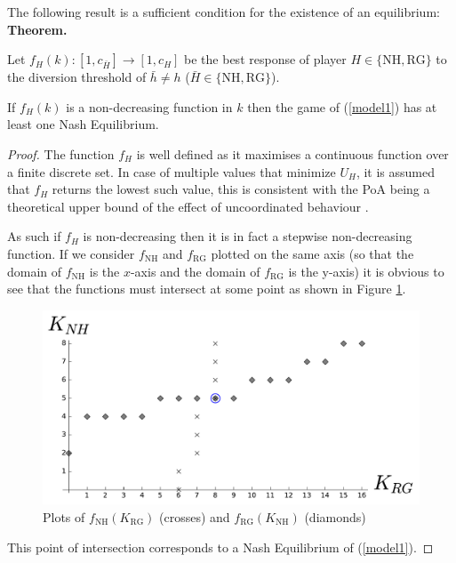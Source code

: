 \documentclass{article}
\newcommand{\NH}{\text{NH}}
\newcommand{\RG}{\text{RG}}
\begin{document}
The following result is a sufficient condition for the existence of an equilibrium:\\


\textbf{Theorem.}

Let $f_{H}(k):[1,c_{\bar H}]\to[1,c_H]$ be the best response of player $H\in\{\NH, \RG\}$ to the diversion threshold of $\bar h\ne h$ ($\bar H\in\{\NH, \RG\}$).

If $f_{H}(k)$ is a non-decreasing function in $k$ then the game of
(\ref{model1}) has at least one Nash Equilibrium.


\begin{proof}

The function $f_H$ is well defined as it maximises a continuous function over a finite discrete set.
In case of multiple values that minimize $U_H$, it is assumed that $f_H$ returns the lowest such value, this is consistent with the PoA being a theoretical upper bound of the effect of uncoordinated behaviour \cite{TimRoughgarden}.

As such if $f_H$ is non-decreasing then it is in fact a stepwise non-decreasing function.
If we consider $f_{\NH}$ and $f_{\RG}$ plotted on the same axis (so that the domain of $f_{\NH}$ is the $x$-axis and the domain of $f_{\RG}$ is the y-axis) it is obvious to see that the functions must intersect at some point as shown in Figure \ref{exampleforproof}.

\begin{figure}[!htbp]
    \begin{center}
        \includegraphics[width=.7\textwidth]{./Images/best_responses_ex_for_proof.pdf}
    \end{center}
    \caption{Plots of $f_{\NH}(K_{\RG})$ (crosses) and $f_{\RG}(K_{\NH})$ (diamonds)}\label{exampleforproof}
\end{figure}

This point of intersection corresponds to a Nash Equilibrium of (\ref{model1}).

\end{proof}
\end{document}
